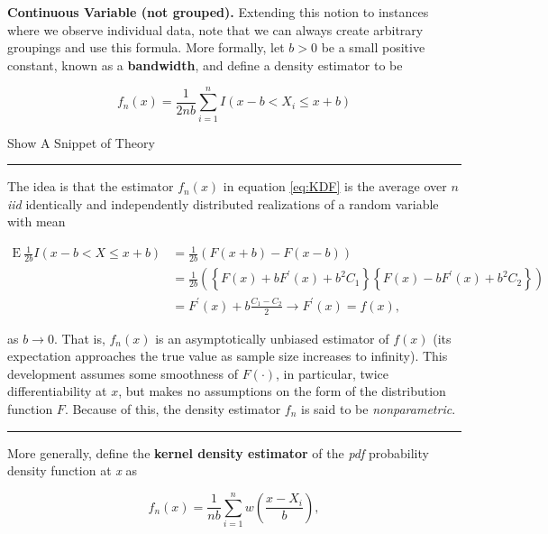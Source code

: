 \documentclass[]{book}
\theoremstyle{definition}
\theoremstyle{definition}
\theoremstyle{definition}
\theoremstyle{remark}
\begin{document}
\textbf{Continuous Variable (not grouped).} Extending this notion to
instances where we observe individual data, note that we can always
create arbitrary groupings and use this formula. More formally, let
\(b>0\) be a small positive constant, known as a \textbf{bandwidth}, and
define a density estimator to be

\begin{equation}
  f_n(x) = \frac{1}{2nb} \sum_{i=1}^n I(x-b < X_i \le x + b)
  \label{eq:KDF}
\end{equation}

Show A Snippet of Theory

\hypertarget{Theorykerneldensity}{}
\begin{center}\rule{0.5\linewidth}{\linethickness}\end{center}

The idea is that the estimator \(f_n(x)\) in equation \eqref{eq:KDF} is
the average over \(n\) \emph{iid}{ identically and independently
distributed} realizations of a random variable with mean

\[
\begin{aligned}
\mathrm{E~ } \frac{1}{2b} I(x-b < X \le x + b) &=  \frac{1}{2b}\left(F(x+b)-F(x-b)\right) \\
&=  \frac{1}{2b} \left( \left\{ F(x) + b F^{\prime}(x) + b^2 C_1\right\}
\left\{ F(x) - b F^{\prime}(x) + b^2 C_2\right\} \right) \\
&=  F^{\prime}(x) + b \frac{C_1-C_2}{2} \rightarrow  F^{\prime}(x) = f(x),
\end{aligned}
\]

as \(b\rightarrow 0\). That is, \(f_n(x)\) is an asymptotically unbiased
estimator of \(f(x)\) (its expectation approaches the true value as
sample size increases to infinity). This development assumes some
smoothness of \(F(\cdot)\), in particular, twice differentiability at
\(x\), but makes no assumptions on the form of the distribution function
\(F\). Because of this, the density estimator \(f_n\) is said to be
\emph{nonparametric}.

\begin{center}\rule{0.5\linewidth}{\linethickness}\end{center}

More generally, define the \textbf{kernel density estimator} of the
\emph{pdf}{ probability density function} at \emph{x} as

\begin{equation} 
  f_n(x) = \frac{1}{nb} \sum_{i=1}^n w\left(\frac{x-X_i}{b}\right) ,
  \label{eq:kernelDens}
\end{equation}
\end{document}
